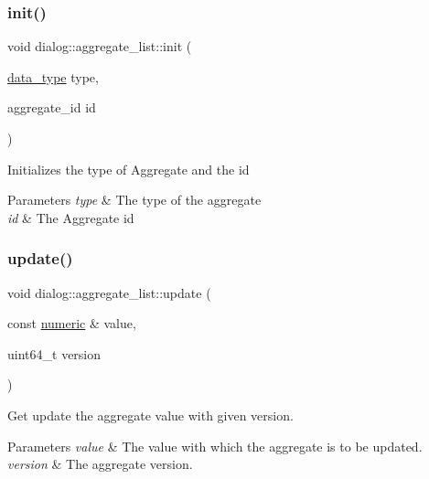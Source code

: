 \subsubsection{\texorpdfstring{init()}{init()}\hspace{0.1cm}{\footnotesize\ttfamily [2/2]}}
{\footnotesize\ttfamily void dialog\+::aggregate\+\_\+list\+::init (\begin{DoxyParamCaption}\item[{\hyperlink{structdialog_1_1data__type}{data\+\_\+type}}]{type,  }\item[{aggregate\+\_\+id}]{id }\end{DoxyParamCaption})\hspace{0.3cm}{\ttfamily [inline]}}

Initializes the type of Aggregate and the id 
\begin{DoxyParams}{Parameters}
{\em type} & The type of the aggregate \\
\hline
{\em id} & The Aggregate id \\
\hline
\end{DoxyParams}
\mbox{\label{classdialog_1_1aggregate__list_a7547b4bbbcc0a41dd020f1c58de69f82}} 
\subsubsection{\texorpdfstring{update()}{update()}}
{\footnotesize\ttfamily void dialog\+::aggregate\+\_\+list\+::update (\begin{DoxyParamCaption}\item[{const \hyperlink{classdialog_1_1numeric}{numeric} \&}]{value,  }\item[{uint64\+\_\+t}]{version }\end{DoxyParamCaption})\hspace{0.3cm}{\ttfamily [inline]}}

Get update the aggregate value with given version.


\begin{DoxyParams}{Parameters}
{\em value} & The value with which the aggregate is to be updated. \\
\hline
{\em version} & The aggregate version. \\
\hline
\end{DoxyParams}
\mbox{\label{classdialog_1_1aggregate__list_a71092c5dd73dff8aaf4ebf655e0e397e}} 
